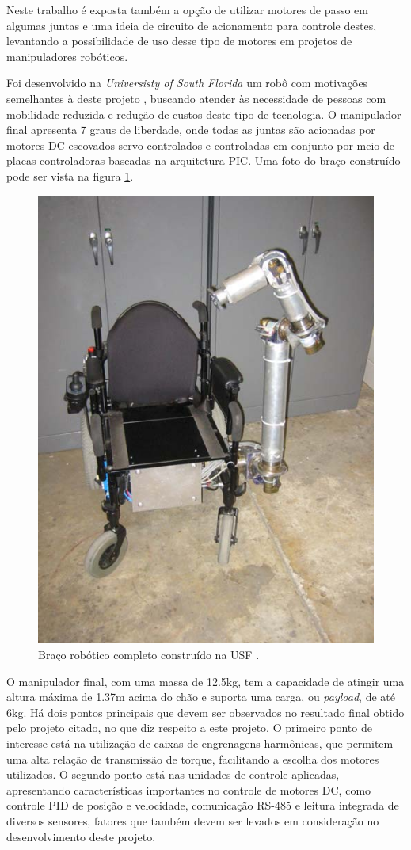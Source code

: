 Neste trabalho é exposta também a opção de utilizar motores de passo em 
algumas juntas e uma ideia de circuito de acionamento para controle destes, 
levantando a possibilidade de uso desse tipo de motores em projetos 
de manipuladores robóticos.

Foi desenvolvido na \textit{Universisty of South Florida} um robô com motivações semelhantes à deste projeto \cite{kevin2005WMRA}, buscando atender às 
necessidade de pessoas com mobilidade reduzida e redução de custos deste tipo de tecnologia. O manipulador final apresenta 7 graus de liberdade, onde todas as
juntas são acionadas por motores DC escovados servo-controlados e controladas em conjunto por meio de placas 
controladoras baseadas na arquitetura PIC.
Uma foto do braço construído pode ser vista na figura \ref{fig:wmra-usf}.

\begin{figure}[ht]
\caption{Braço robótico completo construído na USF \cite{kevin2005WMRA}.}    
\begin{centering}
\includegraphics[width=0.5\columnwidth]{images/fundamentos/wmra-usf.png}
\par\end{centering}

\label{fig:wmra-usf}
\end{figure}

O manipulador final, com uma massa de 12.5kg, tem a capacidade de atingir uma altura máxima de 1.37m acima do chão e suporta uma carga, ou \textit{payload}, de até
6kg. Há dois pontos principais que devem ser observados no resultado final obtido pelo 
projeto citado, no que diz respeito a este projeto. 
O primeiro ponto de interesse está na utilização de caixas de engrenagens
harmônicas, que permitem uma alta relação de transmissão de torque, facilitando
a escolha dos motores utilizados.
O segundo ponto está nas unidades de controle aplicadas, apresentando 
características importantes no controle de motores DC, como controle PID
de posição e velocidade, comunicação RS-485 e leitura integrada de diversos
sensores, fatores que também devem ser levados em consideração no desenvolvimento
deste projeto.

